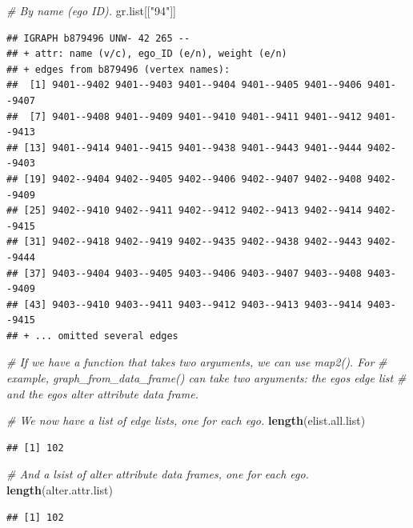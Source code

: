 \documentclass[
]{book}
\newenvironment{Shaded}{\begin{snugshade}}{\end{snugshade}}
\newcommand{\CommentTok}[1]{\textcolor[rgb]{0.56,0.35,0.01}{\textit{#1}}}
\newcommand{\FunctionTok}[1]{\textcolor[rgb]{0.13,0.29,0.53}{\textbf{#1}}}
\newcommand{\NormalTok}[1]{#1}
\newcommand{\StringTok}[1]{\textcolor[rgb]{0.31,0.60,0.02}{#1}}
\begin{document}
\begin{Shaded}
\begin{Highlighting}[]
\CommentTok{\# By name (ego ID).}
\NormalTok{gr.list[[}\StringTok{"94"}\NormalTok{]]}
\end{Highlighting}
\end{Shaded}

\begin{verbatim}
## IGRAPH b879496 UNW- 42 265 -- 
## + attr: name (v/c), ego_ID (e/n), weight (e/n)
## + edges from b879496 (vertex names):
##  [1] 9401--9402 9401--9403 9401--9404 9401--9405 9401--9406 9401--9407
##  [7] 9401--9408 9401--9409 9401--9410 9401--9411 9401--9412 9401--9413
## [13] 9401--9414 9401--9415 9401--9438 9401--9443 9401--9444 9402--9403
## [19] 9402--9404 9402--9405 9402--9406 9402--9407 9402--9408 9402--9409
## [25] 9402--9410 9402--9411 9402--9412 9402--9413 9402--9414 9402--9415
## [31] 9402--9418 9402--9419 9402--9435 9402--9438 9402--9443 9402--9444
## [37] 9403--9404 9403--9405 9403--9406 9403--9407 9403--9408 9403--9409
## [43] 9403--9410 9403--9411 9403--9412 9403--9413 9403--9414 9403--9415
## + ... omitted several edges
\end{verbatim}

\begin{Shaded}
\begin{Highlighting}[]
\CommentTok{\# If we have a function that takes two arguments, we can use map2(). For}
\CommentTok{\# example, graph\_from\_data\_frame() can take two arguments: the ego\textquotesingle{}s edge list}
\CommentTok{\# and the ego\textquotesingle{}s alter attribute data frame. }

\CommentTok{\# We now have a list of edge lists, one for each ego.}
\FunctionTok{length}\NormalTok{(elist.all.list)}
\end{Highlighting}
\end{Shaded}

\begin{verbatim}
## [1] 102
\end{verbatim}

\begin{Shaded}
\begin{Highlighting}[]
\CommentTok{\# And a lsist of alter attribute data frames, one for each ego.}
\FunctionTok{length}\NormalTok{(alter.attr.list)}
\end{Highlighting}
\end{Shaded}

\begin{verbatim}
## [1] 102
\end{verbatim}
\end{document}
